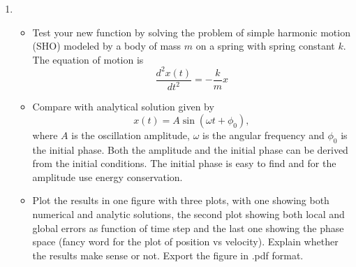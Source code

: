 \documentclass[letterpaper]{article}
\begin{document}
\begin{enumerate}
\item 
\begin{itemize}
\item Test your new function by solving the problem of simple harmonic motion (SHO) modeled by a body of mass $m$ on a spring with spring constant $k$. The equation of motion is 
\begin{equation*}
\dfrac{d^2x(t)}{dt^2}=-\dfrac{k}{m}x
\end{equation*}
\item Compare with analytical solution given by
\begin{equation*}
x(t)=A \sin (\omega t+\phi_0),
\end{equation*}
where $A$ is the oscillation amplitude, $\omega$ is the angular frequency and $\phi_0$ is the initial phase. Both the amplitude and the initial phase can be derived from the initial conditions. The initial phase is easy to find and for the amplitude use energy conservation. 
\item Plot the results in one figure with three plots, with one showing both numerical and analytic solutions, the second plot showing both local and global errors as function of time step and the last one showing the phase space (fancy word for the plot of position vs velocity). Explain whether the results make sense or not. Export the figure in .pdf format.
\end{itemize}
\end{enumerate}
\end{document}
